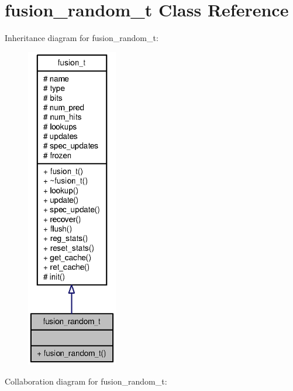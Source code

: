 \section{fusion\_\-random\_\-t Class Reference}
\label{classfusion__random__t}
Inheritance diagram for fusion\_\-random\_\-t:\nopagebreak
\begin{figure}[H]
\begin{center}
\leavevmode
\includegraphics[height=400pt]{classfusion__random__t__inherit__graph}
\end{center}
\end{figure}
Collaboration diagram for fusion\_\-random\_\-t:\nopagebreak
